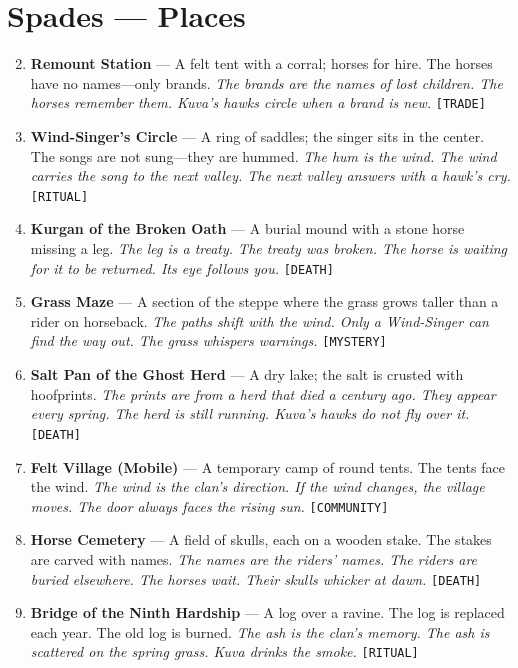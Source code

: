\section*{Spades --- Places}
\label{sec:kuvani-places}
\begin{enumerate}
\setcounter{enumi}{1}
\item \textbf{Remount Station} --- A felt tent with a corral; horses for hire. The horses have no names---only brands.
  \hfill \textit{The brands are the names of lost children. The horses remember them. Kuva's hawks circle when a brand is new.} \texttt{[TRADE]}
\item \textbf{Wind-Singer's Circle} --- A ring of saddles; the singer sits in the center. The songs are not sung---they are hummed.
  \hfill \textit{The hum is the wind. The wind carries the song to the next valley. The next valley answers with a hawk's cry.} \texttt{[RITUAL]}
\item \textbf{Kurgan of the Broken Oath} --- A burial mound with a stone horse missing a leg.
  \hfill \textit{The leg is a treaty. The treaty was broken. The horse is waiting for it to be returned. Its eye follows you.} \texttt{[DEATH]}
\item \textbf{Grass Maze} --- A section of the steppe where the grass grows taller than a rider on horseback.
  \hfill \textit{The paths shift with the wind. Only a Wind-Singer can find the way out. The grass whispers warnings.} \texttt{[MYSTERY]}
\item \textbf{Salt Pan of the Ghost Herd} --- A dry lake; the salt is crusted with hoofprints.
  \hfill \textit{The prints are from a herd that died a century ago. They appear every spring. The herd is still running. Kuva's hawks do not fly over it.} \texttt{[DEATH]}
\item \textbf{Felt Village (Mobile)} --- A temporary camp of round tents. The tents face the wind.
  \hfill \textit{The wind is the clan's direction. If the wind changes, the village moves. The door always faces the rising sun.} \texttt{[COMMUNITY]}
\item \textbf{Horse Cemetery} --- A field of skulls, each on a wooden stake. The stakes are carved with names.
  \hfill \textit{The names are the riders' names. The riders are buried elsewhere. The horses wait. Their skulls whicker at dawn.} \texttt{[DEATH]}
\item \textbf{Bridge of the Ninth Hardship} --- A log over a ravine. The log is replaced each year. The old log is burned.
  \hfill \textit{The ash is the clan's memory. The ash is scattered on the spring grass. Kuva drinks the smoke.} \texttt{[RITUAL]}

\end{enumerate}
